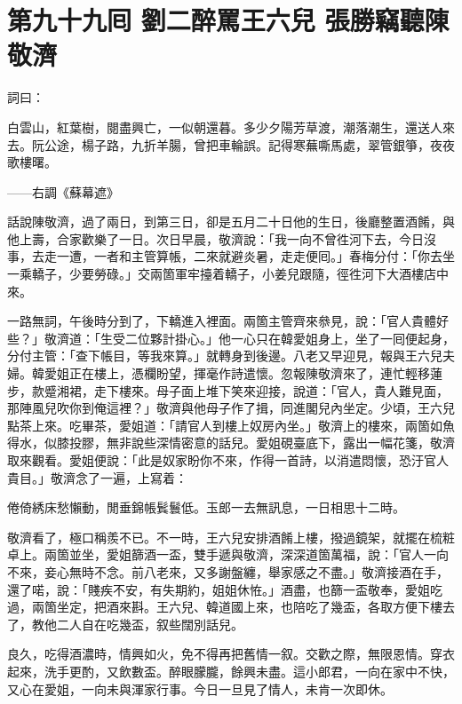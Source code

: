 
\chapter*{第九十九囘 劉二醉罵王六兒 張勝竊聽陳敬濟}


詞曰：

白雲山，紅葉樹，閱盡興亡，一似朝還暮。多少夕陽芳草渡，潮落潮生，還送人來去。阮公途，楊子路，九折羊腸，曾把車輪誤。記得寒蕪嘶馬處，翠管銀箏，夜夜歌樓曙。

——右調《蘇幕遮》

話說陳敬濟，過了兩日，到第三日，卻是五月二十日他的生日，後廳整置酒餚，與他上壽，合家歡樂了一日。次日早晨，敬濟說：「我一向不曾徃河下去，今日沒事，去走一遭，一者和主管算帳，二來就避炎暑，走走便囘。」春梅分付：「你去坐一乘轎子，少要勞碌。」交兩箇軍牢擡着轎子，小姜兒跟隨，徑徃河下大酒樓店中來。

一路無詞，午後時分到了，下轎進入裡面。兩箇主管齊來叅見，說：「官人貴體好些？」敬濟道：「生受二位夥計掛心。」他一心只在韓愛姐身上，坐了一囘便起身，分付主管：「查下帳目，等我來算。」就轉身到後邊。八老又早迎見，報與王六兒夫婦。韓愛姐正在樓上，憑欄盼望，揮毫作詩遣懷。忽報陳敬濟來了，連忙輕移蓮步，款蹙湘裙，走下樓來。母子面上堆下笑來迎接，說道：「官人，貴人難見面，那陣風兒吹你到俺這裡？」敬濟與他母子作了揖，同進閣兒內坐定。少頃，王六兒點茶上來。吃畢茶，愛姐道：「請官人到樓上奴房內坐。」敬濟上的樓來，兩箇如魚得水，似膝投膠，無非說些深情密意的話兒。愛姐硯臺底下，露出一幅花箋，敬濟取來觀看。愛姐便說：「此是奴家盼你不來，作得一首詩，以消遣悶懷，恐汙官人貴目。」敬濟念了一遍，上寫着：

倦倚綉床愁懶動，閒垂錦帳鬂鬟低。玉郎一去無訊息，一日相思十二時。

敬濟看了，極口稱羨不已。不一時，王六兒安排酒餚上樓，撥過鏡架，就擺在梳粧卓上。兩箇並坐，愛姐篩酒一盃，雙手遞與敬濟，深深道箇萬福，說：「官人一向不來，妾心無時不念。前八老來，又多謝盤纏，舉家感之不盡。」敬濟接酒在手，還了喏，說：「賤疾不安，有失期約，姐姐休恠。」酒盡，也篩一盃敬奉，愛姐吃過，兩箇坐定，把酒來斟。王六兒、韓道國上來，也陪吃了幾盃，各取方便下樓去了，{}教他二人自在吃幾盃，叙些闊別話兒。

良久，吃得酒濃時，情興如火，免不得再把舊情一叙。交歡之際，無限恩情。穿衣起來，洗手更酌，又飲數盃。醉眼朦朧，餘興未盡。這小郎君，一向在家中不快，又心在愛姐，一向未與渾家行事。今日一旦見了情人，未肯一次即休。

